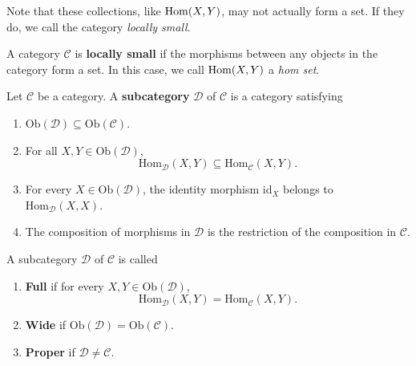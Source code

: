 	Note that these collections, like $\operatorname{Hom}(X, Y)$, may not actually form a set. If they do, we call the category \textit{locally small}. 

	\begin{definition}
	  \label{def:locally-small-category}
		A category $\mathcal{C}$ is \textbf{locally small} if the morphisms between any objects in the category form a set. In this case, we call $\operatorname{Hom}(X, Y)$ a \textit{hom set}. 
	\end{definition}

	\begin{definition}[Subcategory]
	  \label{def:subcategory}
		Let $\mathcal C$ be a category. A \textbf{subcategory} $\mathcal D$ of $\mathcal C$ is a category satisfying
		\begin{enumerate}
			\item $\mathrm{Ob}(\mathcal D) \subseteq \mathrm{Ob}(\mathcal C)$.
			\item For all $X, Y \in \mathrm{Ob}(\mathcal D)$,
				\begin{equation}
					\mathrm{Hom}_{\mathcal D}(X,Y)
					\subseteq \mathrm{Hom}_{\mathcal C}(X,Y).
				\end{equation}
			\item For every $X \in \mathrm{Ob}(\mathcal D)$, the identity morphism $\mathrm{id}_X$ belongs to $\mathrm{Hom}_{\mathcal D}(X,X)$.
			\item The composition of morphisms in $\mathcal D$ is the restriction of the composition in $\mathcal C$.
		\end{enumerate}
		A subcategory $\mathcal D$ of $\mathcal C$ is called
		\begin{enumerate}
			\item \textbf{Full} if for every $X,Y \in \mathrm{Ob}(\mathcal D)$,
				\begin{equation}
					\mathrm{Hom}_{\mathcal D}(X,Y)
					= \mathrm{Hom}_{\mathcal C}(X,Y).
				\end{equation}
			\item \textbf{Wide} if $\mathrm{Ob}(\mathcal D) = \mathrm{Ob}(\mathcal C)$.
			\item \textbf{Proper} if $\mathcal D \neq \mathcal C$.
		\end{enumerate}
	\end{definition}

